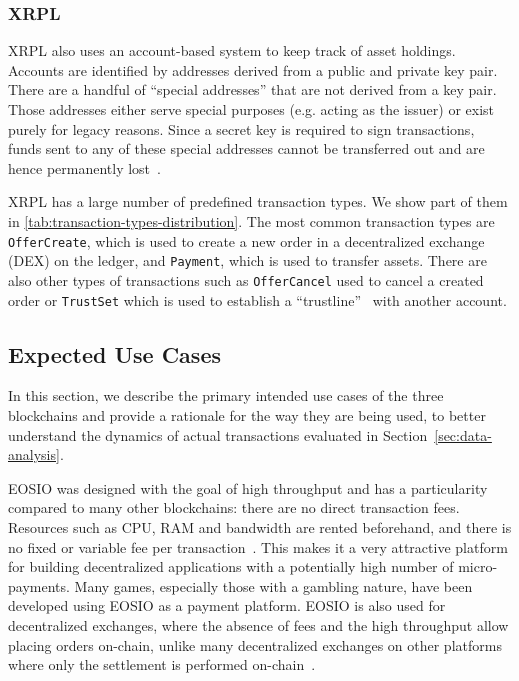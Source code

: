 

\subsubsection{XRPL}
XRPL also uses an account-based system to keep track of asset holdings. 
Accounts are identified by addresses derived from a public and private key pair. 
There are a handful of ``special addresses'' that are not derived from a key pair. 
Those addresses either serve special purposes (e.g. acting as the  issuer) or exist purely for legacy reasons. 
Since a secret key is required to sign transactions, funds sent to any of these special addresses cannot be transferred out and are hence permanently lost~\cite{XRPLedger2019}.

XRPL has a large number of predefined transaction types. 
We show part of them in \autoref{tab:transaction-types-distribution}. 
The most common transaction types are \texttt{OfferCreate}, which is used to create a new order in a decentralized exchange (DEX) on the ledger, and \texttt{Payment}, which is used to transfer assets. 
There are also other types of transactions such as \texttt{OfferCancel} used to cancel a created order or \texttt{TrustSet} which is used to establish a ``trustline''~\cite{xrp_ledger_overview} with another account.

\subsection{Expected Use Cases}
\label{sec:usecase}
In this section, we describe the primary intended use cases of the three blockchains and provide a rationale for the way they are being used, to better understand the dynamics of actual transactions evaluated in Section~\ref{sec:data-analysis}.

 EOSIO was designed with the goal of high throughput and has a particularity compared to many other blockchains: there are no direct transaction fees. 
Resources such as CPU, RAM and bandwidth are rented beforehand, and there is no fixed or variable fee per transaction~\cite{EOS}.
This makes it a very attractive platform for building decentralized applications with a potentially high number of micro-payments. 
Many games, especially those with a gambling nature, have been developed using EOSIO as a payment platform.
EOSIO is also used for decentralized exchanges, where the absence of fees and the high throughput allow placing orders on-chain, unlike many decentralized exchanges on other platforms where only the settlement is performed on-chain~\cite{warren20170x}.

